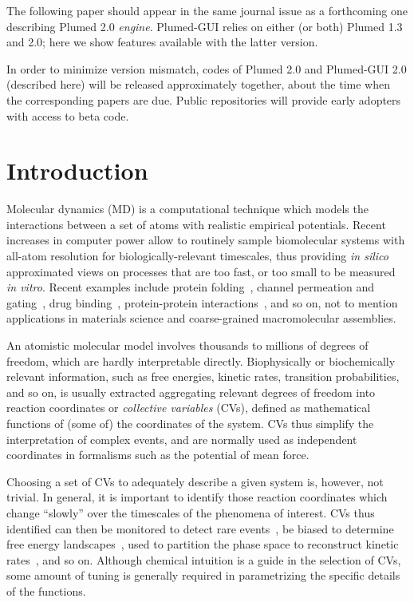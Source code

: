 \documentclass[preprint,review,11pt]{elsarticle}
\begin{document}
The following paper should appear in the same journal issue as a
forthcoming one describing Plumed 2.0 \emph{engine}. Plumed-GUI relies
on either (or both) Plumed 1.3 and 2.0; here we show features
available with the latter version.

In order to minimize version mismatch, codes of Plumed 2.0 and
Plumed-GUI 2.0 (described here) will be released approximately
together, about the time when the corresponding papers are due. Public
repositories will provide early adopters with access to beta code.


\vspace{2cm}

\section{Introduction}

Molecular dynamics (MD) is a computational technique which models the
interactions between a set of atoms with realistic empirical
potentials. Recent increases in computer power allow to routinely
sample biomolecular systems with all-atom resolution for
biologically-relevant timescales, thus providing \emph{in silico}
approximated views on processes that are too fast, or too small to be
measured \emph{in vitro}. Recent examples include protein
folding~\cite{Lindorff-Larsen_Piana_Dror_Shaw_2011}, channel
permeation and
gating~\cite{Jensen_Jogini_Borhani_Leffler_Dror_Shaw_2012}, drug
binding~\cite{Shan_Kim_Eastwood_Dror_Seeliger_Shaw_2011,Buch_Giorgino_2011},
protein-protein
interactions~\cite{Ahmad_Gu_Helms_2008,Giorgino_Buch_2012}, and so on,
not to mention applications in materials science and coarse-grained
macromolecular assemblies.

An atomistic molecular model involves thousands to millions of degrees
of freedom, which are hardly interpretable directly. Biophysically or
biochemically relevant information, such as free energies, kinetic
rates, transition probabilities, and so on,  is usually extracted
aggregating relevant degrees of freedom into reaction coordinates or
\emph{collective variables} (CVs), defined as mathematical functions of (some
of) the coordinates of the system.  CVs thus  simplify the
interpretation of complex events, and are normally used as independent
coordinates in formalisms such as the potential of mean force.

Choosing a set of CVs to adequately describe a given system is,
however, not trivial. In general, it is important to identify those
reaction coordinates which change ``slowly'' over the timescales of
the phenomena of interest. CVs thus identified can then be monitored
to detect rare events~\cite{Giorgino_Buch_2012}, be biased to
determine free energy landscapes~\cite{Laio_Parrinello_2002},  used
to partition the phase space to reconstruct
kinetic rates~\cite{Biarnes_Pietrucci_Marinelli_Laio_2012,Noe_Fischer_2008},
and so on.  Although chemical intuition is a guide in the selection of
CVs, some amount of tuning is generally required in parametrizing the
specific details of the functions.
\end{document}
